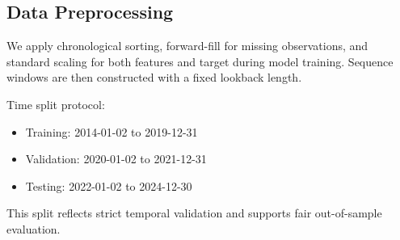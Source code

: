 \subsection{Data Preprocessing}
We apply chronological sorting, forward-fill for missing observations, and standard scaling for both features and target during model training. Sequence windows are then constructed with a fixed lookback length.

Time split protocol:
\begin{itemize}
    \item Training: 2014-01-02 to 2019-12-31
    \item Validation: 2020-01-02 to 2021-12-31
    \item Testing: 2022-01-02 to 2024-12-30
\end{itemize}

This split reflects strict temporal validation and supports fair out-of-sample evaluation.
